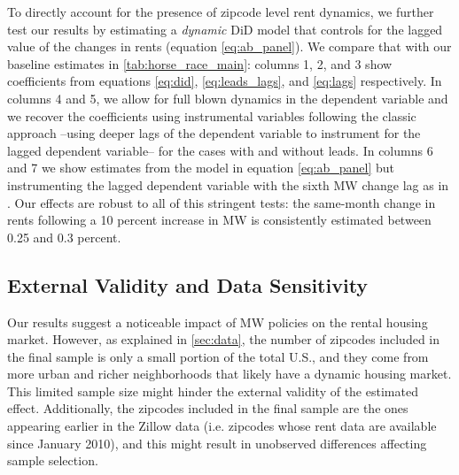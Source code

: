 To directly account for the presence of zipcode level rent dynamics, we further test our results by 
estimating a \textit{dynamic} DiD model that controls for the lagged value of the changes in rents 
(equation \ref{eq:ab_panel}). We compare that with our baseline estimates in 
\autoref{tab:horse_race_main}: columns 1, 2, and 3 show coefficients from equations \eqref{eq:did}, 
\eqref{eq:leads_lags}, and \eqref{eq:lags} respectively. In columns 4 and 5, we allow for full blown 
dynamics in the dependent variable and we recover the coefficients using instrumental variables 
following the classic \textcite{arellano1991some} approach --using deeper lags of the dependent 
variable to instrument for the lagged dependent variable-- for the cases with and without leads. 
In columns 6 and 7 we show estimates from the model in equation \ref{eq:ab_panel} but instrumenting 
the lagged dependent variable with the sixth MW change lag as in \textcite{meer2016effects}. Our 
effects are robust to all of this stringent tests: the same-month change in rents following a 10 
percent increase in MW is consistently estimated between 0.25 and 0.3 percent. 


\subsection{External Validity and Data Sensitivity}\label{sec:sample_rest}

Our results suggest a noticeable impact of MW policies on the rental housing market. However, as 
explained in \autoref{sec:data}, the number of zipcodes included in the final sample is only a 
small portion of the total U.S., and they come from more urban and richer neighborhoods that likely 
have a dynamic housing market. This limited sample size might hinder the external validity of the 
estimated effect. Additionally, the zipcodes included in the final sample are the ones appearing 
earlier in the Zillow data (i.e. zipcodes whose rent data are available since January 2010), and 
this might result in unobserved differences affecting sample selection.

